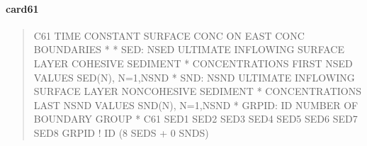 \documentclass[letterpaper,10pt,english]{sphinxmanual}
\begin{document}
\paragraph{card61}
\label{\detokenize{inputfiles/runcontrol/card61:card61}}\label{\detokenize{inputfiles/runcontrol/card61::doc}}\begin{quote}

\begin{sphinxVerbatim}[commandchars=\\\{\}]
\PYGZhy{}\PYGZhy{}\PYGZhy{}\PYGZhy{}\PYGZhy{}\PYGZhy{}\PYGZhy{}\PYGZhy{}\PYGZhy{}\PYGZhy{}\PYGZhy{}\PYGZhy{}\PYGZhy{}\PYGZhy{}\PYGZhy{}\PYGZhy{}\PYGZhy{}\PYGZhy{}\PYGZhy{}\PYGZhy{}\PYGZhy{}\PYGZhy{}\PYGZhy{}\PYGZhy{}\PYGZhy{}\PYGZhy{}\PYGZhy{}\PYGZhy{}\PYGZhy{}\PYGZhy{}\PYGZhy{}\PYGZhy{}\PYGZhy{}\PYGZhy{}\PYGZhy{}\PYGZhy{}\PYGZhy{}\PYGZhy{}\PYGZhy{}\PYGZhy{}\PYGZhy{}\PYGZhy{}\PYGZhy{}\PYGZhy{}\PYGZhy{}\PYGZhy{}\PYGZhy{}\PYGZhy{}\PYGZhy{}\PYGZhy{}\PYGZhy{}\PYGZhy{}\PYGZhy{}\PYGZhy{}\PYGZhy{}\PYGZhy{}\PYGZhy{}\PYGZhy{}\PYGZhy{}\PYGZhy{}\PYGZhy{}\PYGZhy{}\PYGZhy{}\PYGZhy{}\PYGZhy{}\PYGZhy{}\PYGZhy{}\PYGZhy{}\PYGZhy{}\PYGZhy{}\PYGZhy{}\PYGZhy{}\PYGZhy{}\PYGZhy{}\PYGZhy{}\PYGZhy{}\PYGZhy{}\PYGZhy{}
C61 TIME CONSTANT SURFACE CONC ON EAST CONC BOUNDARIES
*
*    SED: NSED ULTIMATE INFLOWING SURFACE LAYER COHESIVE SEDIMENT
*         CONCENTRATIONS  FIRST NSED VALUES SED(N), N=1,NSND
*    SND: NSND ULTIMATE INFLOWING SURFACE LAYER NON\PYGZhy{}COHESIVE SEDIMENT
*         CONCENTRATIONS LAST NSND VALUES SND(N), N=1,NSND
*  GRPID: ID NUMBER OF BOUNDARY GROUP
*
C61      SED1      SED2      SED3      SED4      SED5      SED6      SED7      SED8      GRPID ! ID (8 SEDS + 0 SNDS)
\end{sphinxVerbatim}
\end{quote}
\end{document}
